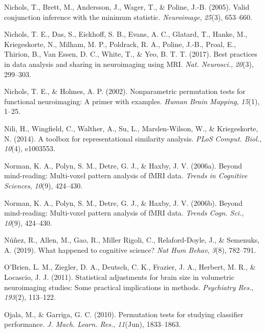 \documentclass[11pt,american,a4paper,oneside,]{memoir} %
\begin{document}
\leavevmode\hypertarget{ref-nichols2005valid}{}%
Nichols, T., Brett, M., Andersson, J., Wager, T., \& Poline, J.-B. (2005). Valid conjunction inference with the minimum statistic. \emph{Neuroimage}, \emph{25}(3), 653--660.

\leavevmode\hypertarget{ref-Nichols2017-ze}{}%
Nichols, T. E., Das, S., Eickhoff, S. B., Evans, A. C., Glatard, T., Hanke, M., Kriegeskorte, N., Milham, M. P., Poldrack, R. A., Poline, J.-B., Proal, E., Thirion, B., Van Essen, D. C., White, T., \& Yeo, B. T. T. (2017). Best practices in data analysis and sharing in neuroimaging using MRI. \emph{Nat. Neurosci.}, \emph{20}(3), 299--303.

\leavevmode\hypertarget{ref-nichols2002nonparametric}{}%
Nichols, T. E., \& Holmes, A. P. (2002). Nonparametric permutation tests for functional neuroimaging: A primer with examples. \emph{Human Brain Mapping}, \emph{15}(1), 1--25.

\leavevmode\hypertarget{ref-Nili2014-ar}{}%
Nili, H., Wingfield, C., Walther, A., Su, L., Marslen-Wilson, W., \& Kriegeskorte, N. (2014). A toolbox for representational similarity analysis. \emph{PLoS Comput. Biol.}, \emph{10}(4), e1003553.

\leavevmode\hypertarget{ref-norman2006beyond}{}%
Norman, K. A., Polyn, S. M., Detre, G. J., \& Haxby, J. V. (2006a). Beyond mind-reading: Multi-voxel pattern analysis of fMRI data. \emph{Trends in Cognitive Sciences}, \emph{10}(9), 424--430.

\leavevmode\hypertarget{ref-Norman2006-bt}{}%
Norman, K. A., Polyn, S. M., Detre, G. J., \& Haxby, J. V. (2006b). Beyond mind-reading: Multi-voxel pattern analysis of fMRI data. \emph{Trends Cogn. Sci.}, \emph{10}(9), 424--430.

\leavevmode\hypertarget{ref-Nunez2019-lh}{}%
Núñez, R., Allen, M., Gao, R., Miller Rigoli, C., Relaford-Doyle, J., \& Semenuks, A. (2019). What happened to cognitive science? \emph{Nat Hum Behav}, \emph{3}(8), 782--791.

\leavevmode\hypertarget{ref-OBrien2011-lj}{}%
O'Brien, L. M., Ziegler, D. A., Deutsch, C. K., Frazier, J. A., Herbert, M. R., \& Locascio, J. J. (2011). Statistical adjustments for brain size in volumetric neuroimaging studies: Some practical implications in methods. \emph{Psychiatry Res.}, \emph{193}(2), 113--122.

\leavevmode\hypertarget{ref-Ojala2010-rc}{}%
Ojala, M., \& Garriga, G. C. (2010). Permutation tests for studying classifier performance. \emph{J. Mach. Learn. Res.}, \emph{11}(Jun), 1833--1863.
\end{document}
